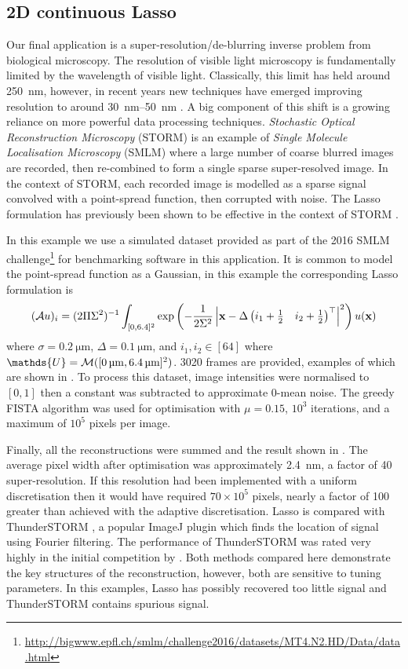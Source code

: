 \documentclass[10pt,a4paper,onecolumn]{article} \usepackage[latin1]{inputenc}
\numberwithin{equation}{section}
\let\F\mathds\let\C\mathcal\newcommand{\R}{\F{R}}\newcommand{\A}{\C{A}}
\renewcommand{\vec}{\mathbf}
\newcommand{\UCmath}[1]{%
	\begingroup
	\ucmathlist\uppercase\expandafter{#1}%
	\endgroup
}
\newcommand{\ucmathlist}{%
	\def\alpha{\mathrm{A}}%
	\def\beta{\mathrm{B}}%
	\let\gamma=\Gamma
	\let\delta=\Delta
	\def\epsilon{\mathrm{E}}%
	\def\varepsilon{\mathrm{E}}%
	\def\zeta{\mathrm{Z}}%
	\def\eta{\mathrm{H}}%
	\let\theta=\Theta
	\let\vartheta=\Theta
	\def\iota{\mathrm{I}}%
	\def\kappa{\mathrm{K}}%
	\let\lambda=\Lambda
	\def\mu{\mathrm{M}}%
	\def\nu{\mathrm{N}}%
	\let\xi=\Xi
	\let\pi=\Pi
	\let\varpi=\Pi
	\def\rho{\mathrm{P}}%
	\def\varrho{\mathrm{P}}%
	\let\sigma=\Sigma
	\def\tau{\mathrm{T}}%
	\let\upsilon=\Upsilon
	\let\phi=\Phi
	\let\varphi=\Phi
	\def\chi{\mathrm{X}}%
	\let\psi=\Psi
	\let\omega=\Omega
}
\newcommand{\caps}[1]{\UCmath{#1}}
\newcommand*{\varf}[1]{%
	\IfEqCase{#1}{%
		{0}{u}%
		{1}{v}%
		{2}{w}%
	}[u#1]%
}
\newcommand*{\spcf}[1]{%
	\IfEqCase{#1}{%
		{0}{\F{U}}%
		{1}{\F{V}}%
		{2}{\F{W}}%
	}[\F{U}#1]%
}
\newcommand*{\varx}[1]{%
	\IfEqCase{#1}{%
		{0}{x}%
		{1}{y}%
		{2}{z}%
		{3}{r}%
	}[x#1]%
}
\newcommand*{\Varx}[1]{\caps{\varx{#1}}}
\newcommand*{\vvarx}[1]{\vec{\varx{#1}}}\newcommand*{\vVarx}[1]{\vec{\Varx{#1}}}
\begin{document}
\subsection{2D continuous Lasso}
Our final application is a super-resolution/de-blurring inverse problem from biological microscopy. The resolution of visible light microscopy is fundamentally limited by the wavelength of visible light. Classically, this limit has held around \SI{250}{\nano\meter}, however, in recent years new techniques have emerged improving resolution to around \SIrange{30}{50}{\nano\meter} \cite{Schermelleh2019}. A big component of this shift is a growing reliance on more powerful data processing techniques. \emph{Stochastic Optical Reconstruction Microscopy} (STORM) is an example of \emph{Single Molecule Localisation Microscopy} (SMLM) where a large number of coarse blurred images are recorded, then re-combined to form a single sparse super-resolved image. In the context of STORM, each recorded image is modelled as a sparse signal convolved with a point-spread function, then corrupted with noise. The Lasso formulation has previously been shown to be effective in the context of STORM \cite{Huang2017,Denoyelle2019}.

In this example we use a simulated dataset provided as part of the 2016 SMLM challenge\footnote{\url{http://bigwww.epfl.ch/smlm/challenge2016/datasets/MT4.N2.HD/Data/data.html}} for benchmarking software in this application. It is common to model the point-spread function as a Gaussian, in this example the corresponding Lasso formulation  is 
$$ (\A\varf0)_{i} = (2\pi\sigma^2)^{-1}\int_{[0,6.4]^2} \exp\left(-\frac{1}{2\sigma^2}\left|\vvarx0- \Delta\begin{pmatrix}i_1+\tfrac12 & i_2+\tfrac12\end{pmatrix}^\top \right|^2\right)\varf0(\vvarx0)$$
where $\sigma=\SI{0.2}{\micro\meter}$, $\Delta=\SI{0.1}{\micro\meter}$, and $i_1,i_2\in[64]$ where $\spcf0=\C M([\SI{0}{\micro\meter},\SI{6.4}{\micro\meter}]^2)$. 3020 frames are provided, examples of which are shown in . To process this dataset, image intensities were normalised to $[0,1]$ then a constant was subtracted to approximate 0-mean noise. The greedy FISTA algorithm was used for optimisation with $\mu=0.15$, $10^3$ iterations, and a maximum of $10^5$ pixels per image. 

Finally, all the reconstructions were summed and the result shown in . The average pixel width after optimisation was approximately \SI{2.4}{\nano\meter}, a factor of 40 super-resolution. If this resolution had been implemented with a uniform discretisation then it would have required $70\times 10^5$ pixels, nearly a factor of 100 greater than achieved with the adaptive discretisation. Lasso is compared with ThunderSTORM \cite{Ovesny2014}, a popular ImageJ plugin \cite{Schindelin2012} which finds the location of signal using Fourier filtering. The performance of ThunderSTORM was rated very highly in the initial competition by \cite{Sage2015}. Both methods compared here demonstrate the key structures of the reconstruction, however, both are sensitive to tuning parameters. In this examples, Lasso has possibly recovered too little signal and ThunderSTORM contains spurious signal. 
\end{document}
